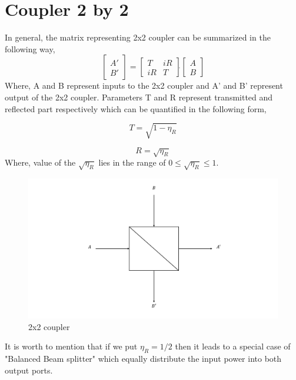 \clearpage
\section{Coupler 2 by 2}

In general, the matrix representing 2x2 coupler can be summarized in the following way,
\begin{equation}
\begin{bmatrix}
A' \\
B'
\end{bmatrix}=\begin{bmatrix}
  					T  & iR \\
					iR & T
			  \end{bmatrix} \dot{}{\begin{bmatrix}
			  				     A \\
			  	                 B
			  	                 \end{bmatrix}}
\end{equation}
Where, A and B represent inputs to the 2x2 coupler and A' and B' represent output of the 2x2 coupler. Parameters T and R represent transmitted and reflected part respectively which can be quantified in the following form,

\begin{equation}
T=\sqrt{1-\eta_{R}}
\end{equation}

\begin{equation}
R=\sqrt{\eta_{R}}
\end{equation}
Where, value of the $\sqrt{\eta_{R}}$ lies in the range of $0 \leq \sqrt{\eta_{R}} \leq 1$.
\begin{figure}
	\centering
	\includegraphics[width=\textwidth]{./lib/coupler_2_by_2/figures/coupler_2_by_2.pdf}
	\caption{2x2 coupler}\label{}
\end{figure}

It is worth to mention that if we put $\eta_{R}=1/2$ then it leads to a special case of "Balanced Beam splitter" which equally distribute the input power into both output ports.
